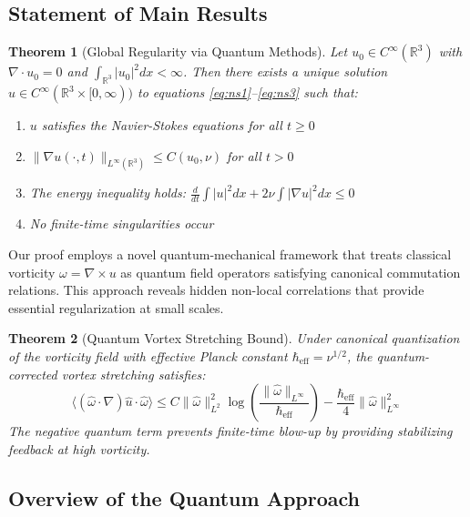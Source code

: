 \documentclass[11pt,a4paper]{article}
\newtheorem{theorem}{Theorem}[section]
\theoremstyle{definition}
\theoremstyle{remark}
\newcommand{\R}{\mathbb{R}}
\newcommand{\heff}{\hbar_{\text{eff}}}
\newcommand{\omegahat}{\hat{\omega}}
\newcommand{\uhat}{\hat{u}}
\newcommand{\norm}[1]{\|#1\|}
\newcommand{\avg}[1]{\langle #1 \rangle}
\begin{document}
\subsection{Statement of Main Results}

\begin{theorem}[Global Regularity via Quantum Methods]
\label{thm:main}
Let $u_0 \in C^\infty(\R^3)$ with $\nabla \cdot u_0 = 0$ and $\int_{\R^3} |u_0|^2 dx < \infty$. Then there exists a unique solution $u \in C^\infty(\R^3 \times [0,\infty))$ to equations \eqref{eq:ns1}--\eqref{eq:ns3} such that:
\begin{enumerate}
    \item $u$ satisfies the Navier-Stokes equations for all $t \geq 0$
    \item $\norm{\nabla u(\cdot,t)}_{L^\infty(\R^3)} \leq C(u_0, \nu)$ for all $t > 0$
    \item The energy inequality holds: $\frac{d}{dt}\int |u|^2 dx + 2\nu \int |\nabla u|^2 dx \leq 0$
    \item No finite-time singularities occur
\end{enumerate}
\end{theorem}

Our proof employs a novel quantum-mechanical framework that treats classical vorticity $\omega = \nabla \times u$ as quantum field operators satisfying canonical commutation relations. This approach reveals hidden non-local correlations that provide essential regularization at small scales.

\begin{theorem}[Quantum Vortex Stretching Bound]
\label{thm:quantum_bound}
Under canonical quantization of the vorticity field with effective Planck constant $\heff = \nu^{1/2}$, the quantum-corrected vortex stretching satisfies:
\begin{equation}
\avg{(\omegahat \cdot \nabla)\uhat \cdot \omegahat} \leq C\norm{\omegahat}_{L^2}^2 \log\left(\frac{\norm{\omegahat}_{L^\infty}}{\heff}\right) - \frac{\heff}{4}\norm{\omegahat}_{L^\infty}^2
\label{eq:quantum_bound}
\end{equation}
The negative quantum term prevents finite-time blow-up by providing stabilizing feedback at high vorticity.
\end{theorem}

\subsection{Overview of the Quantum Approach}
\end{document}
